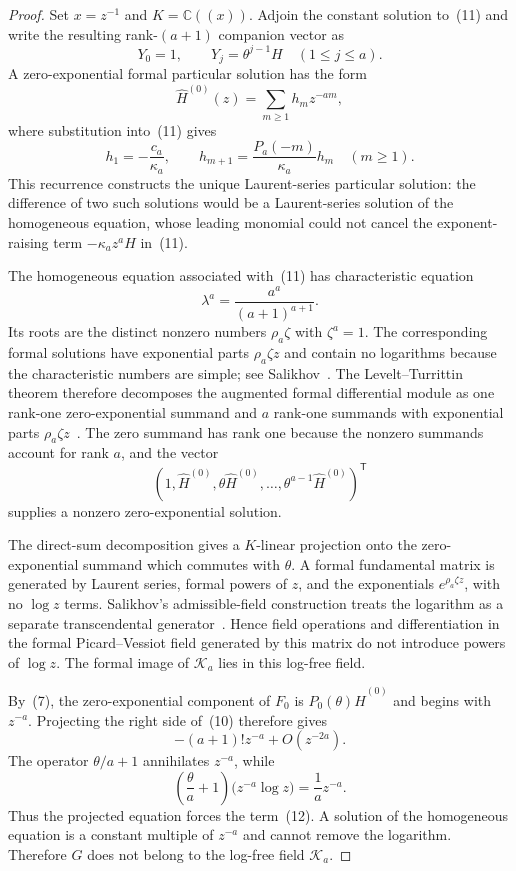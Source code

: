 \documentclass[12pt]{article}
\begin{document}
\begin{proof}
Set $x=z^{-1}$ and $K=\mathbb C((x))$. Adjoin the constant solution to~(11) and write the resulting rank-$(a+1)$ companion vector as
\[
Y_0=1,
\qquad
Y_j=\theta^{j-1}H\quad(1\leq j\leq a).
\]
A zero-exponential formal particular solution has the form
\[
\widehat H^{(0)}(z)=\sum_{m\geq1}h_mz^{-am},
\]
where substitution into~(11) gives
\[
h_1=-\frac{c_a}{\kappa_a},
\qquad
h_{m+1}=\frac{P_a(-m)}{\kappa_a}h_m
\quad(m\geq1).
\tag{13}
\]
This recurrence constructs the unique Laurent-series particular solution: the difference of two such solutions would be a Laurent-series solution of the homogeneous equation, whose leading monomial could not cancel the exponent-raising term $-\kappa_a z^aH$ in~(11).

The homogeneous equation associated with~(11) has characteristic equation
\[
\lambda^a=\frac{a^a}{(a+1)^{a+1}}.
\]
Its roots are the distinct nonzero numbers $\rho_a\zeta$ with $\zeta^a=1$. The corresponding formal solutions have exponential parts $\rho_a\zeta z$ and contain no logarithms because the characteristic numbers are simple; see Salikhov~\cite[Remark~2, p.~206]{salikhov}. The Levelt--Turrittin theorem therefore decomposes the augmented formal differential module as one rank-one zero-exponential summand and $a$ rank-one summands with exponential parts $\rho_a\zeta z$~\cite[Chapter~3, Theorem~3.1]{vdput-singer}. The zero summand has rank one because the nonzero summands account for rank $a$, and the vector
\[
\left(1,\widehat H^{(0)},\theta\widehat H^{(0)},\ldots,
\theta^{a-1}\widehat H^{(0)}\right)^{\mathsf T}
\]
supplies a nonzero zero-exponential solution.

The direct-sum decomposition gives a $K$-linear projection onto the zero-exponential summand which commutes with $\theta$. A formal fundamental matrix is generated by Laurent series, formal powers of $z$, and the exponentials $e^{\rho_a\zeta z}$, with no $\log z$ terms. Salikhov's admissible-field construction treats the logarithm as a separate transcendental generator~\cite[pp.~207--210]{salikhov}. Hence field operations and differentiation in the formal Picard--Vessiot field generated by this matrix do not introduce powers of $\log z$. The formal image of $\mathcal K_a$ lies in this log-free field.

By~(7), the zero-exponential component of $F_0$ is $P_0(\theta)\widehat H^{(0)}$ and begins with $z^{-a}$. Projecting the right side of~(10) therefore gives
\[
-(a+1)!z^{-a}+O(z^{-2a}).
\]
The operator $\theta/a+1$ annihilates $z^{-a}$, while
\[
\left(\frac{\theta}{a}+1\right)
\bigl(z^{-a}\log z\bigr)=\frac1a z^{-a}.
\]
Thus the projected equation forces the term~(12). A solution of the homogeneous equation is a constant multiple of $z^{-a}$ and cannot remove the logarithm. Therefore $G$ does not belong to the log-free field $\mathcal K_a$.
\end{proof}
\end{document}
